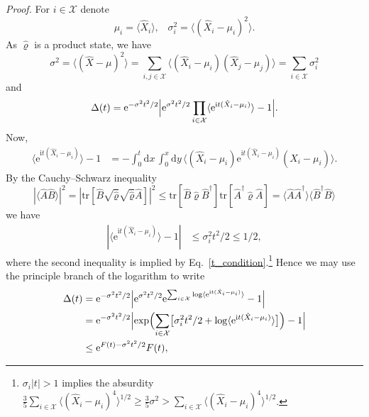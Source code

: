 \documentclass[aps,10pt,epsfig,graphics,mathbbm]{article}
\newcommand{\me}{\mathrm{e}}
\newcommand{\mi}{\mathrm{i}}
\newcommand{\md}{\mathrm{d}}
\newcommand{\proof}{{\em Proof. }}
\begin{document}
\proof
For $i\in\mathcal{X}$ denote
\begin{equation}
\mu_i=\langle\hat{X}_i\rangle,\;\;\;
\sigma_i^2=\langle(\hat{X}_i-\mu_i)^2\rangle.
\end{equation}
As $\hat{\varrho}$ is a product state, we have 
\begin{equation}
\sigma^2=\langle (\hat{X}-\mu)^2\rangle=\sum_{i,j\in\mathcal{X}}\langle(\hat{X}_i-\mu_i)(\hat{X}_j-\mu_j)\rangle
=\sum_{i\in\mathcal{X}}\sigma_i^2
\end{equation}
and
\begin{equation}
\Delta(t)=\me^{-\sigma^2t^2/2}\Bigl|\me^{\sigma^2t^2/2}\prod_{i\in\mathcal{X}}\langle\me^{\mi t(\hat{X}_i-\mu_i)}\rangle-1\Bigr|.
\end{equation}
Now,
\begin{equation}
\begin{split}
\langle\me^{\mi t(\hat{X}_i-\mu_i)}\rangle-1&= -\int_0^t\md x\,\int_0^x\md y\,\bigl\langle(\hat{X}_i-\mu_i)\me^{\mi t(\hat{X}_i-\mu_i)}(\hat{X}_i-\mu_i)\bigr\rangle.
\end{split}
\end{equation}
By the Cauchy--Schwarz inequality
\begin{equation}
\label{CS}
|\langle\hat{A}\hat{B}\rangle|^2=|\text{tr}[\hat{B}\sqrt{\hat{\varrho}}\sqrt{\hat{\varrho}}\hat{A}]|^2\le\text{tr}[\hat{B}\hat{\varrho}\hat{B}^\dagger]\text{tr}[\hat{A}^\dagger\hat{\varrho}\hat{A}]=\langle\hat{A}\hat{A}^\dagger\rangle\langle\hat{B}^\dagger\hat{B}\rangle
\end{equation}
we have
\begin{equation}
\label{second_moment_bound}
\begin{split}
|\langle\me^{\mi t(\hat{X}_i-\mu_i)}\rangle-1|&\le \sigma_i^2t^2/2\le 1/2,
\end{split}
\end{equation}
where the second inequality is implied by Eq.~\eqref{t_condition}.\footnote{$\sigma_i|t|> 1$ implies the absurdity 
$\frac{3}{5}\sum_{i\in\mathcal{X}}\langle (\hat{X}_i-\mu_i)^4\rangle^{1/2}\ge\frac{3}{5}\sigma^2>\sum_{i\in\mathcal{X}}\langle (\hat{X}_i-\mu_i)^4\rangle^{1/2}$.} Hence we may use the principle branch of the logarithm to write
\begin{equation}
\begin{split}
\Delta(t)&=\me^{-\sigma^2t^2/2}\Bigl|\me^{\sigma^2t^2/2}\me^{\sum_{i\in\mathcal{X}}\log\langle\me^{\mi t(\hat{X}_i-\mu_i)}\rangle}-1\Bigr|\\
&=\me^{-\sigma^2t^2/2}\Bigl|\exp\Bigl(\sum_{i\in\mathcal{X}}\bigl[\sigma_i^2 t^2/2+\log\langle\me^{\mi t(\hat{X}_i-\mu_i)}\rangle\bigr]\Bigr)-1\Bigr|\\
&\le \me^{F(t)-\sigma^2t^2/2}F(t), 
\end{split}
\end{equation}
\end{document}

